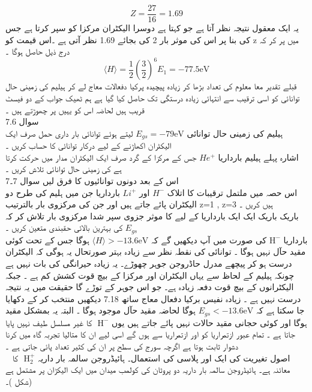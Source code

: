 \[Z=\frac{27}{16}=1.69\]
یہ ایک معقول نتیجہ نظر آتا ہے جو کہتا ہے دوسرا الیکٹران مرکزا کو سپر کرتا ہے جس کی بنا پر اس کی موثر بار 2 کی بجائے 1.69 نظر آتی ہے ۔اس قیمت کو z میں پر کر کہ درج ذیل حاصل ہوگا ۔\\
\[\langle H \rangle =\frac{1}{2}(\frac{3}{2})^{6}E_{1}=-77.5\text{eV}\]
قبلے تقدیر معا معلوم کی تعداد بڑھا کر زیادہ پیچیدہ پرکیا دفعالات معاج لے کر ہیلیم کی زمینی حال توانائی کو اسی ترقیب سے انتہائی زیادہ درستگی تک حاصل کیا گیا ہے ہم ٹھیک جواب کے دو فیسٹ قریب ہیں لحاضہ اس کو یہیں پر چھوڑتے ہیں ۔\\
سوال 
7.6\\
ہیلیم کی زمینی حال توانائی 
\(E_{gs}=-79\text{eV}\)
 لیتے ہوئے توانائی بار داری حمل صرف ایک الیکٹران اکھاڑنے کے لیے درکار توانائی کا حساب کریں ۔\\
اشارہ پہلے ہیلیم بارداریا
 \(He^{+}\)
 جس کے مرکزا کے گرد صرف ایک الیکٹران مدار میں حرکت کرتا ہے کی زمینی حال توانائی تلاش کریں ۔\\
اس کے بعد دونوں توانائیوں کا فرق لیں 
سوال 7۔7
\\
اس حصہ میں ملتمل ترقیبات کا اتلاک
 \(H^{-}\)
 اور
 \(Li^{+}\)
 بارداریا جن میں ہلیم کی طرح دو الیکٹران پائے جاتے ہیں اور جن کی مرکزوی بار بالترتیب z=1 , z=3 ہیں کریں ۔\\
باریک باریک ایک ایک بارداریا کے لیے کا موثر جزوی سپر شدا مرکزوی بار تلاش کر کہ 
\(E_{gs}\)
 کی بہترین بالائی حقبندی متعین کریں ۔\\
 بارداریا
 \(\text{H}^{-}\)
 کی صورت میں آپ دیکھیں گے کہ 
 \(\langle H \rangle > -13.6\text{eV}\) 
 ہوگا جس کے تحت کوئی مقید حآل نہیں ہوگا ۔
توانائی کی نقطہ نظر سے زیادہ بہتر صورتحال یہ ہوگی کہ الیکٹران درست ہو کر پیچھے مدرل حاڈروجن جوہر چھوڑے۔ یہ زیادہ حیرانگی کی بات نہیں ہے چونکہ ہیلیم کے لحاظ سے یہاں الیکٹران اور مرکزا کے بیچ قوت کشش کم ہے ۔ جبکہ الیکٹرانوں کے بیچ قوت دفعہ زیادہ ہے۔
جو اس جوہر کے توڑے گا حقیقت میں یہ نتیجہ درست نہیں ہے ۔ زیادہ نفیس برکیا دفعال معاج ساتھ 
7.18
دیکھیں 
منتخب کر کے دکھایا جا سکتا ہے کہ 
\(E_{gs}<-13.6\text{eV}\)
ہوگا لحاضہ مقید حآل موجود ہوگا ۔
البتہ یہ بمشکل مقید ہوگا اور کوئی حجانی مقید حالات نہیں پائے جاتے ہیں یوں
\(\text{ H}^{-}\)
 کا غیر مسلسل طیف نہیں پایا جاتا ہے ۔
تمام عبور ازتمراریا کو اور ازتمراریا سے ہوں گے اسی لیے ان کا متالیا تجربہ گاہ میں کرنا دشوار ثابت ہوتا ہے اگرچہ سورج کی سطح پر ان کی کثیر تعداد پائی جاتی ہے ۔\\
\
اصول تغیریت کی ایک اور پلاسی کی استعمال۔ ہائیڈروجن سالمہ بار داریہ
\(\text{ H}_{2}^{+}\)
 کا معائنہ ہے۔ ہائیڈروجن سالمہ بار داریہ دو پروٹان کی کولمب میدان میں ایک الیکڑان پر مشتمل ہے (شکل )۔ 
